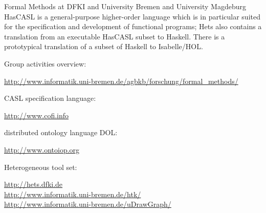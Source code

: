 \begin{hcarentry}[section]{Formal Methods at DFKI and University Bremen and University Magdeburg}
HasCASL is a general-purpose higher-order language which is in particular
suited for the specification and development of functional programs; Hets also
contains a translation from an executable HasCASL subset to Haskell. There is
a prototypical translation of a subset of Haskell to Isabelle/HOL.

\FurtherReading
\begin{compactitem}
\item Group activities overview:

\url{http://www.informatik.uni-bremen.de/agbkb/forschung/formal\_methods/}

\item CASL specification language:

\url{http://www.cofi.info}

\item distributed ontology language DOL:

\url{http://www.ontoiop.org}

\item Heterogeneous tool set:

\url{http://hets.dfki.de}\\
\url{http://www.informatik.uni-bremen.de/htk/}\\
\url{http://www.informatik.uni-bremen.de/uDrawGraph/}
\end{compactitem}
\end{hcarentry}
